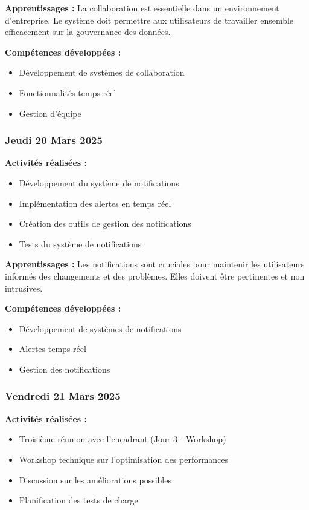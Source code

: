 \documentclass[12pt,a4paper]{article}
\begin{document}
\textbf{Apprentissages :}
La collaboration est essentielle dans un environnement d'entreprise. Le système doit permettre aux utilisateurs de travailler ensemble efficacement sur la gouvernance des données.

\textbf{Compétences développées :}
\begin{itemize}
    \item Développement de systèmes de collaboration
    \item Fonctionnalités temps réel
    \item Gestion d'équipe
\end{itemize}

\subsubsection{Jeudi 20 Mars 2025}
\textbf{Activités réalisées :}
\begin{itemize}
    \item Développement du système de notifications
    \item Implémentation des alertes en temps réel
    \item Création des outils de gestion des notifications
    \item Tests du système de notifications
\end{itemize}

\textbf{Apprentissages :}
Les notifications sont cruciales pour maintenir les utilisateurs informés des changements et des problèmes. Elles doivent être pertinentes et non intrusives.

\textbf{Compétences développées :}
\begin{itemize}
    \item Développement de systèmes de notifications
    \item Alertes temps réel
    \item Gestion des notifications
\end{itemize}

\subsubsection{Vendredi 21 Mars 2025}
\textbf{Activités réalisées :}
\begin{itemize}
    \item Troisième réunion avec l'encadrant (Jour 3 - Workshop)
    \item Workshop technique sur l'optimisation des performances
    \item Discussion sur les améliorations possibles
    \item Planification des tests de charge
\end{itemize}
\end{document}
